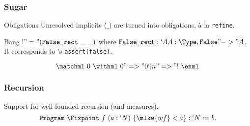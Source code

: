 \begin{frame}
  \frametitle{Sugar}

  \begin{block}{Obligations}
    Unresolved implicits ($\_$) are turned into obligations, \`a la \alert{\texttt{refine}}.
  \end{block}
  
  \begin{block}{Bang}
    $! "=" (\texttt{False\_rect}~\_~\_)$ where {\small $\texttt{False\_rect} : `A
    A : \Type, \texttt{False} "->" A$}. It corresponds to \ML's
    \texttt{assert(false)}.
  \end{block}
  
  \[\matchml~0~\withml~0 "=>" 0 `| n "=>" !~\enml\]
  

\end{frame}

\begin{frame}
  \frametitle{Recursion}

  Support for well-founded recursion (and measures).
  \[ \texttt{Program}~\Fixpoint~f~(a : `N)~\{ \mlkw{wf} < a \} : `N := b. \]
  
\end{frame}


